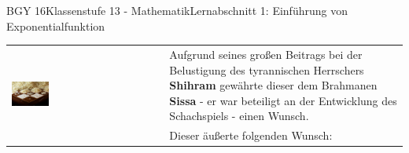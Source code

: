 \documentclass[oneside,openany,headings=optiontotoc,11pt,numbers=noenddot]{scrreprt}
\begin{document}
	\begin{worksheet}{BGY 16}{Klassenstufe 13 - Mathematik}{Lernabschnitt 1: Einführung von Exponentialfunktion}
				
		\noindent
		\sffamily
		\begin{framed}
			\begin{tabularx}{\textwidth}{lX}
				\multirow{2}{*}{\includegraphics[align=t,width=0.25\textwidth]{../99_Bilder/01_ExpFkt/Schachbrett.jpg}} & Aufgrund seines großen Beitrags bei der Belustigung des tyrannischen Herrschers \textbf{Shihram} gewährte dieser dem Brahmanen \textbf{Sissa} - er war beteiligt an der Entwicklung des Schachspiels - einen Wunsch.\\
				& Dieser äußerte folgenden Wunsch:\\
			\end{tabularx}
			\begin{tabularx}{\textwidth}{X}


\end{tabularx}
\end{framed}
\end{worksheet}
\end{document}
